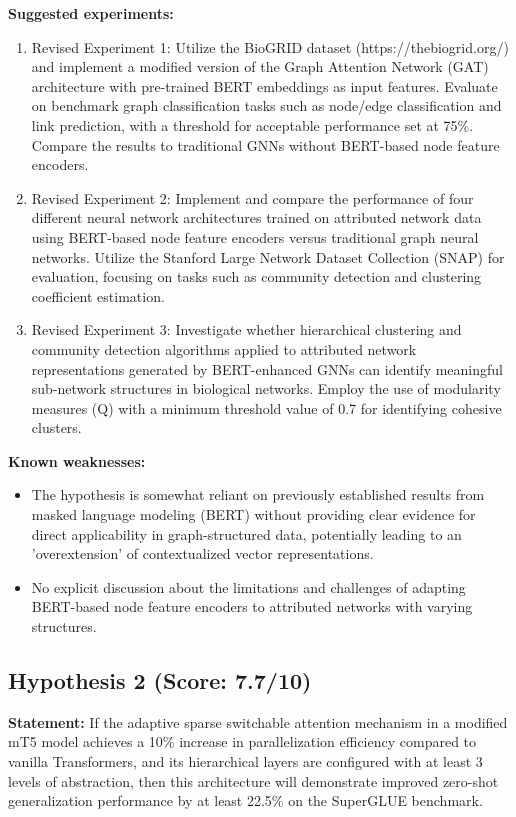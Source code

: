 \documentclass[12pt,a4paper]{article}
\begin{document}
\textbf{Suggested experiments:}
\begin{enumerate}
  \item Revised Experiment 1: Utilize the BioGRID dataset (https://thebiogrid.org/) and implement a modified version of the Graph Attention Network (GAT) architecture with pre-trained BERT embeddings as input features. Evaluate on benchmark graph classification tasks such as node/edge classification and link prediction, with a threshold for acceptable performance set at 75\%. Compare the results to traditional GNNs without BERT-based node feature encoders.
  \item Revised Experiment 2: Implement and compare the performance of four different neural network architectures trained on attributed network data using BERT-based node feature encoders versus traditional graph neural networks. Utilize the Stanford Large Network Dataset Collection (SNAP) for evaluation, focusing on tasks such as community detection and clustering coefficient estimation.
  \item Revised Experiment 3: Investigate whether hierarchical clustering and community detection algorithms applied to attributed network representations generated by BERT-enhanced GNNs can identify meaningful sub-network structures in biological networks. Employ the use of modularity measures (Q) with a minimum threshold value of 0.7 for identifying cohesive clusters.
\end{enumerate}

\textbf{Known weaknesses:}
\begin{itemize}
  \item The hypothesis is somewhat reliant on previously established results from masked language modeling (BERT) without providing clear evidence for direct applicability in graph-structured data, potentially leading to an 'overextension' of contextualized vector representations.
  \item No explicit discussion about the limitations and challenges of adapting BERT-based node feature encoders to attributed networks with varying structures.
\end{itemize}
\subsection*{Hypothesis 2 (Score: 7.7/10)}

\textbf{Statement:} If the adaptive sparse switchable attention mechanism in a modified mT5 model achieves a 10\% increase in parallelization efficiency compared to vanilla Transformers, and its hierarchical layers are configured with at least 3 levels of abstraction, then this architecture will demonstrate improved zero-shot generalization performance by at least 22.5\% on the SuperGLUE benchmark.
\end{document}
